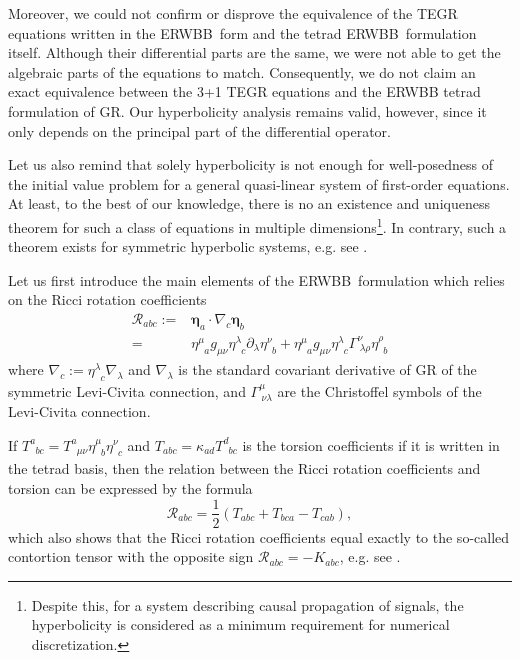 \documentclass[
10pt, %
a4paper, %
oneside, %
twocolumn,
headinclude,footinclude, %
BCOR5mm, %
]{scrartcl}
\newcommand{\ERWBB}{{ERWBB}}
\newcommand{\pd}[1]{\partial_{#1}}
\newcommand{\mg}[1]{\kappa_{#1}}			%
\newcommand{\itetrsymbol}{\eta}
\newcommand{\itetr}[2]{\itetrsymbol^{#1}_{\phantom{#1}#2}}
\newcommand{\Tors}[2]{T^{#1}_{\phantom{#1}#2}}
\begin{document}
	Moreover, we could not confirm or disprove the equivalence of the TEGR
	equations written in the \ERWBB\ form and the tetrad \ERWBB\ formulation
	itself. Although their differential parts are the same, we were not able to
	get the algebraic parts of the equations to match. Consequently, we do not
	claim an exact equivalence between the 3+1 TEGR equations and the ERWBB
	tetrad formulation of GR. Our hyperbolicity analysis remains valid, however,
	since it only depends on the principal part of the differential operator.

	Let us also remind that solely hyperbolicity is not enough for
	well-posedness of the initial value problem for a general quasi-linear
	system of first-order equations. At least, to the best of our knowledge,
	there is no an existence and uniqueness theorem for such a class of
	equations in multiple dimensions\footnote{ Despite this, for a system
	describing causal propagation of signals, the hyperbolicity is considered
	as a minimum requirement for numerical discretization.}. In contrary, such a
	theorem exists for symmetric hyperbolic systems, e.g. see \cite{Serre2007}.
	
	Let us first introduce the main elements of the \ERWBB\ formulation which
	relies on the Ricci rotation coefficients
	\begin{align}\label{eqn.Ricci.rot}
		\mathcal{R}_{abc} 
		:= & \bm{\itetrsymbol}_a\cdot\nabla_c \bm{\itetrsymbol}_b \nonumber\\
		= & \itetr{\mu}{a} g_{\mu\nu} \itetr{\lambda}{c} \pd{\lambda} \itetr{\nu}{b} 
		+   \itetr{\mu}{a} g_{\mu\nu} \itetr{\lambda}{c} \Gamma^{\nu}_{\ \lambda\rho} 
		\itetr{\rho}{b}	
	\end{align}
	where $ \nabla_c := \itetr{\lambda}{c} \nabla_{\lambda} $ and $ \nabla_{\lambda} $ is the 
	standard 
	covariant derivative of GR of the symmetric Levi-Civita connection, and $ 
	\Gamma^{\mu}_{\ 
		\nu\lambda} $ are the Christoffel symbols of the Levi-Civita connection.
	
	If $ \Tors{a}{bc} = \Tors{a}{\mu\nu}\itetr{\mu}{b}\itetr{\nu}{c} $ and $ \Tors{}{abc} = \mg{ad} 
	\Tors{d}{bc} $ is the torsion coefficients if it is written in the tetrad basis, then the relation between the Ricci 
	rotation coefficients and torsion can be expressed by the formula
	\begin{equation}\label{eqn.Ricci.Tors}
		\mathcal{R}_{abc} = \frac{1}{2} 
		\left(  
			\Tors{}{abc} + \Tors{}{bca} - \Tors{}{cab}
		\right),
	\end{equation}
	which also shows that the Ricci rotation coefficients equal exactly to the so-called contortion 
	tensor with the opposite sign $ \mathcal{R}_{abc} =-K_{abc} $, e.g. see 
	\cite[Eq.(1.63)]{AldrovandiPereiraBook}.
	
\end{document}
